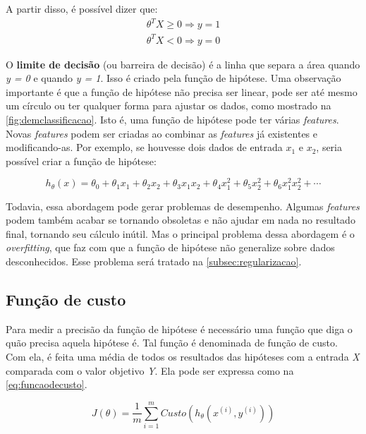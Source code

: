 A partir disso, é possível dizer que:
\begin{align}
\theta^TX \geq 0 \Rightarrow y = 1 \nonumber \\
\theta^TX < 0 \Rightarrow y = 0 \nonumber
\end{align}

O \textbf{limite de decisão} (ou barreira de decisão) é a linha que separa a área quando \textit{y = 0} e quando \textit{y = 1}. Isso é criado pela função de hipótese. Uma observação importante é que a função de hipótese não precisa ser linear, pode ser até mesmo um círculo ou ter qualquer forma para ajustar os dados, como mostrado na \autoref{fig:demclassificacao}. Isto é, uma função de hipótese pode ter várias \textit{features}. Novas \textit{features} podem ser criadas ao combinar as \textit{features} já existentes e modificando-as. Por exemplo, se houvesse dois dados de entrada $x_1$ e $x_2$, seria possível criar a função de hipótese:

\begin{equation}
\nonumber
h_{\theta}(x) = \theta_0 + \theta_1 x_1 + \theta_2 x_2 + \theta_3 x_1 x_2 + \theta_4 x_1^2 + \theta_5 x_2^2 + \theta_6 x_1^2 x_2^2 + \cdots
\end{equation}

Todavia, essa abordagem pode gerar problemas de desempenho. Algumas \textit{features} podem também acabar se tornando obsoletas e não ajudar em nada no resultado final, tornando seu cálculo inútil. Mas o principal problema dessa abordagem é o \textit{overfitting}, que faz com que a função de hipótese não generalize sobre dados desconhecidos. Esse problema será tratado na \autoref{subsec:regularizacao}.


\subsection{Função de custo}

Para medir a precisão da função de hipótese é necessário uma função que diga o quão precisa aquela hipótese é. Tal função é denominada de função de custo. Com ela, é feita uma média de todos os resultados das hipóteses com a entrada \textit{X} comparada com o valor objetivo \textit{Y}. Ela pode ser expressa como na \autoref{eq:funcaodecusto}.

\begin{equation}
\label{eq:funcaodecusto}
J(\theta) = \frac{1}{m}\sum\limits_{i=1}^{m}Custo(h_{\theta}(x^{(i)}, y^{(i)}))
\end{equation}

